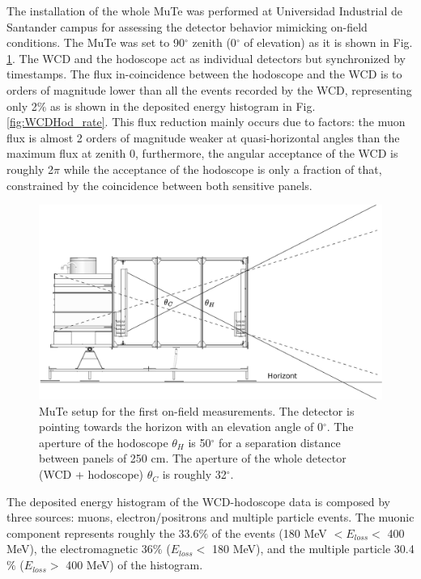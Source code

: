 \documentclass[letterpaper,11pt]{article}
\begin{document}
The installation of the whole MuTe was performed at Universidad Industrial de Santander campus for assessing the detector behavior mimicking on-field conditions. The MuTe was set to 90$^{\circ}$ zenith (0$^{\circ}$ of elevation) as it is shown in Fig. \ref{fig:WCDHod}. The WCD and the hodoscope act as individual detectors but synchronized by timestamps. The flux in-coincidence between the hodoscope and the WCD is to orders of magnitude lower than all the events recorded by the WCD, representing only 2$\%$ as is shown in the deposited energy histogram in Fig. \ref{fig:WCDHod_rate}. This flux reduction mainly occurs due to factors: the muon flux is almost 2 orders of magnitude weaker at quasi-horizontal angles than the maximum flux at zenith 0, furthermore, the angular acceptance of the WCD is roughly 2$\pi$ while the acceptance of the hodoscope is only a fraction of that, constrained by the coincidence between both sensitive panels.

\begin{figure}[htb]
\centering
\includegraphics[width=0.7\columnwidth]{Figures/Acceptance.eps}
\caption{MuTe setup for the first on-field measurements. The detector is pointing towards the horizon with an elevation angle of 0$^{\circ}$. The aperture of the hodoscope $\theta_H$ is 50$^{\circ}$ for a separation distance between panels of 250 cm. The aperture of the whole detector (WCD + hodoscope) $\theta_C$ is roughly 32$^{\circ}$.}
\label{fig:WCDHod}
\end{figure}

The deposited energy histogram of the WCD-hodoscope data is composed by three sources: muons, electron/positrons and multiple particle events. The muonic component represents roughly the 33.6$\%$ of the events (180 MeV $< E_{loss} <$ 400 MeV), the electromagnetic 36$\%$ ($E_{loss} <$ 180 MeV), and the multiple particle 30.4$\%$ ($E_{loss} >$ 400 MeV) of the histogram. 
\end{document}
